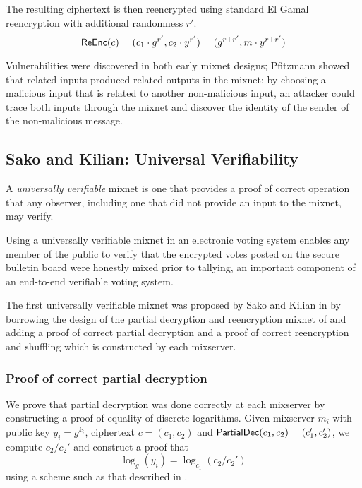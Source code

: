 The resulting ciphertext is then reencrypted using standard El Gamal reencryption with additional randomness $r'$.
$$
\operatorname{\mathsf{ReEnc}}(c) = (c_1 \cdot g^{r'}, c_2 \cdot y^{r'}) = (g^{r+r'}, m \cdot y^{r+r'})
$$

Vulnerabilities were discovered in both early mixnet designs; Pfitzmann \cite{pfitzmann90, pfitzmann95} showed that related inputs produced related outputs in the mixnet; by choosing a malicious input that is related to another non-malicious input, an attacker could trace both inputs through the mixnet and discover the identity of the sender of the non-malicious message.

\subsection{Sako and Kilian: Universal Verifiability}

\begin{definition}
A \emph{universally verifiable} mixnet is one that provides a proof of correct operation that any observer, including one that did not provide an input to the mixnet, may verify.
\end{definition}

Using a universally verifiable mixnet in an electronic voting system enables any member of the public to verify that the encrypted votes posted on the secure bulletin board were honestly mixed prior to tallying, an important component of an end-to-end verifiable voting system.

The first universally verifiable mixnet was proposed by Sako and Kilian in \cite{sako95} by borrowing the design of the partial decryption and reencryption mixnet of \cite{park94} and adding a proof of correct partial decryption and a proof of correct reencryption and shuffling which is constructed by each mixserver.

\subsubsection{Proof of correct partial decryption}

We prove that partial decryption was done correctly at each mixserver by constructing a proof of equality of discrete logarithms. Given mixserver $m_i$ with public key $y_i = g^{k_i}$, ciphertext $c = (c_1, c_2)$ and $\operatorname{\mathsf{PartialDec}}(c_1, c_2) = (c_1', c_2')$, we compute $c_2 / c_2'$ and construct a proof that
$$\log_{g}(y_i) = \log_{c_1}(c_2 / c_2')$$
using a scheme such as that described in \cite{chaum-pedersen}.

